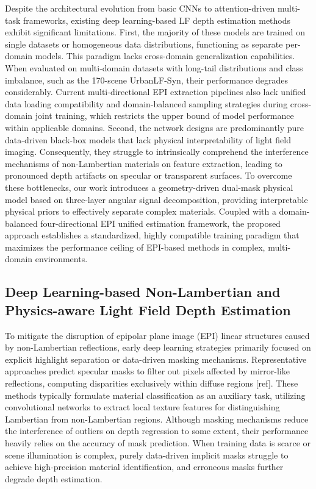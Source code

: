 \documentclass[lettersize,journal]{IEEEtran}
\begin{document}
Despite the architectural evolution from basic CNNs to attention-driven multi-task frameworks, existing deep learning-based LF depth estimation methods exhibit significant limitations. First, the majority of these models are trained on single datasets or homogeneous data distributions, functioning as separate per-domain models. This paradigm lacks cross-domain generalization capabilities. When evaluated on multi-domain datasets with long-tail distributions and class imbalance, such as the 170-scene UrbanLF-Syn, their performance degrades considerably. Current multi-directional EPI extraction pipelines also lack unified data loading compatibility and domain-balanced sampling strategies during cross-domain joint training, which restricts the upper bound of model performance within applicable domains. Second, the network designs are predominantly pure data-driven black-box models that lack physical interpretability of light field imaging. Consequently, they struggle to intrinsically comprehend the interference mechanisms of non-Lambertian materials on feature extraction, leading to pronounced depth artifacts on specular or transparent surfaces. To overcome these bottlenecks, our work introduces a geometry-driven dual-mask physical model based on three-layer angular signal decomposition, providing interpretable physical priors to effectively separate complex materials. Coupled with a domain-balanced four-directional EPI unified estimation framework, the proposed approach establishes a standardized, highly compatible training paradigm that maximizes the performance ceiling of EPI-based methods in complex, multi-domain environments.

\subsection{Deep Learning-based Non-Lambertian and Physics-aware Light Field Depth Estimation}

To mitigate the disruption of epipolar plane image (EPI) linear structures caused by non-Lambertian reflections, early deep learning strategies primarily focused on explicit highlight separation or data-driven masking mechanisms. Representative approaches predict specular masks to filter out pixels affected by mirror-like reflections, computing disparities exclusively within diffuse regions [ref]. These methods typically formulate material classification as an auxiliary task, utilizing convolutional networks to extract local texture features for distinguishing Lambertian from non-Lambertian regions. Although masking mechanisms reduce the interference of outliers on depth regression to some extent, their performance heavily relies on the accuracy of mask prediction. When training data is scarce or scene illumination is complex, purely data-driven implicit masks struggle to achieve high-precision material identification, and erroneous masks further degrade depth estimation.
\end{document}
